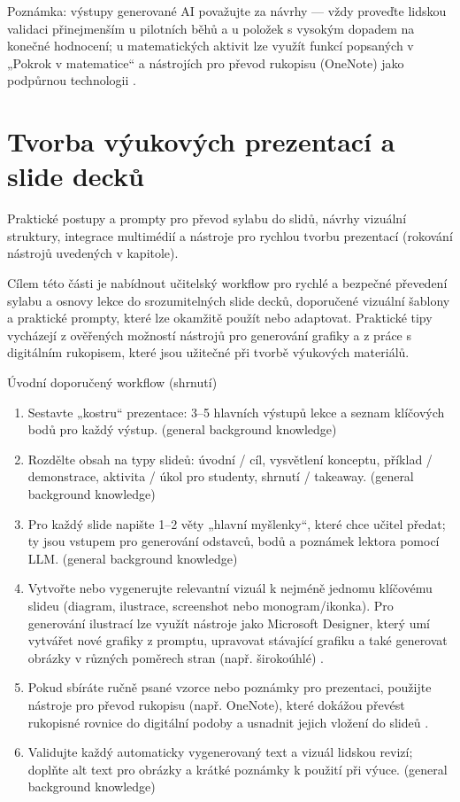 \documentclass{report}%
\begin{document}
\medskip
Poznámka: výstupy generované AI považujte za návrhy — vždy proveďte lidskou validaci přinejmenším u pilotních běhů a u položek s vysokým dopadem na konečné hodnocení; u matematických aktivit lze využít funkcí popsaných v „Pokrok v matematice“ a nástrojích pro převod rukopisu (OneNote) jako podpůrnou technologii \cite{kb_ai_101_tipu_pdf_04e4a115_page_8_1}.%

%
\section{Tvorba výukových prezentací a slide decků}%
Praktické postupy a prompty pro převod sylabu do slidů, návrhy vizuální struktury, integrace multimédií a nástroje pro rychlou tvorbu prezentací (rokování nástrojů uvedených v kapitole).%


%

Cílem této části je nabídnout učitelský workflow pro rychlé a bezpečné převedení sylabu a osnovy lekce do srozumitelných slide decků, doporučené vizuální šablony a praktické prompty, které lze okamžitě použít nebo adaptovat. Praktické tipy vycházejí z ověřených možností nástrojů pro generování grafiky a z práce s digitálním rukopisem, které jsou užitečné při tvorbě výukových materiálů.

Úvodní doporučený workflow (shrnutí)
\begin{enumerate}
  \item Sestavte „kostru“ prezentace: 3--5 hlavních výstupů lekce a seznam klíčových bodů pro každý výstup.  (general background knowledge)
  \item Rozdělte obsah na typy slideů: úvodní / cíl, vysvětlení konceptu, příklad / demonstrace, aktivita / úkol pro studenty, shrnutí / takeaway. (general background knowledge)
  \item Pro každý slide napište 1--2 věty „hlavní myšlenky“, které chce učitel předat; ty jsou vstupem pro generování odstavců, bodů a poznámek lektora pomocí LLM. (general background knowledge)
  \item Vytvořte nebo vygenerujte relevantní vizuál k nejméně jednomu klíčovému slideu (diagram, ilustrace, screenshot nebo monogram/ikonka). Pro generování ilustrací lze využít nástroje jako Microsoft Designer, který umí vytvářet nové grafiky z promptu, upravovat stávající grafiku a také generovat obrázky v různých poměrech stran (např. širokoúhlé) \cite{kb_ai_101_tipu_pdf_04e4a115_page_51_1}.
  \item Pokud sbíráte ručně psané vzorce nebo poznámky pro prezentaci, použijte nástroje pro převod rukopisu (např. OneNote), které dokážou převést rukopisné rovnice do digitální podoby a usnadnit jejich vložení do slideů \cite{kb_ai_101_tipu_pdf_04e4a115_page_8_1}.
  \item Validujte každý automaticky vygenerovaný text a vizuál lidskou revizí; doplňte alt text pro obrázky a krátké poznámky k použití při výuce. (general background knowledge)
\end{enumerate}
\end{document}
